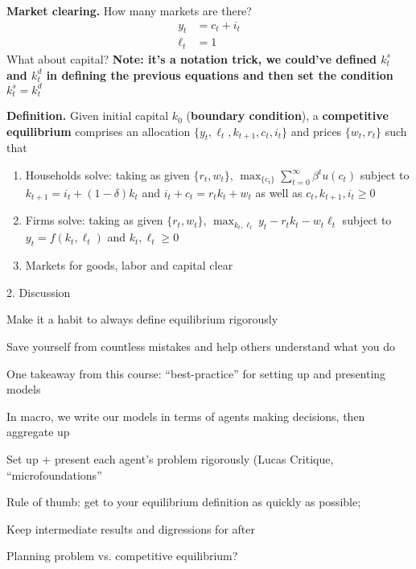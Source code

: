 \documentclass[11pt, aspectratio=169]{beamer}
\newenvironment{witemize}{\itemize\addtolength{\itemsep}{10pt}}{\enditemize}
\begin{document}
\begin{frame}{}

\vspace{4mm}
\textbf{Market clearing.} How many markets are there? 
\begin{align*}
	y_t &= c_t + i_t \\
	\ell_t &= 1 
\end{align*}
What about capital? \textbf{Note: it's a notation trick, we could've defined $k_t^s$ and $k_t^d$ in defining the previous equations and then set the condition $k_t^s=k_t^d$}

\vspace{5mm}
\textbf{Definition.} Given initial capital $k_0$ (\textbf{boundary condition}), a \textbf{competitive equilibrium} comprises an allocation $\{y_t, \ell_t, k_{t+1}, c_t, i_t\}$ and prices $\{w_t, r_t\}$ such that
\begin{enumerate}
	\item Households solve: taking as given $\{r_t, w_t\}$, $\max_{\{c_t\}} \sum_{t = 0}^\infty \beta^t u(c_t)$ subject to $k_{t+1} = i_t + (1 - \delta) k_t$ and $i_t + c_t = r_t k_t + w_t$ as well as $c_t, k_{t+1}, i_t \geq 0$

	\item Firms solve: taking as given $\{r_t, w_t\}$, $\max_{k_t, \ell_t} y_t - r_t k_t - w_t \ell_t$ subject to $y_t = f(k_t, \ell_t)$ and $k_t, \ell_t \geq 0$

	\item Markets for goods, labor and capital clear
\end{enumerate}

\end{frame}


\begin{frame}{2. Discussion}

\begin{witemize}
\item Make it a habit to always define equilibrium rigorously

	{\footnotesize Save yourself from countless mistakes and help others understand what you do}

\item One takeaway from this course: ``best-practice'' for setting up and presenting models

\item In macro, we write our models in terms of agents making decisions, then aggregate up 

	{\footnotesize Set up + present each agent's problem rigorously (Lucas Critique, ``microfoundations''}

\item Rule of thumb: get to your equilibrium definition as quickly as possible; 

	{\footnotesize Keep intermediate results and digressions for after}

\item Planning problem vs. competitive equilibrium?
\end{witemize}
\end{frame}
\end{document}
